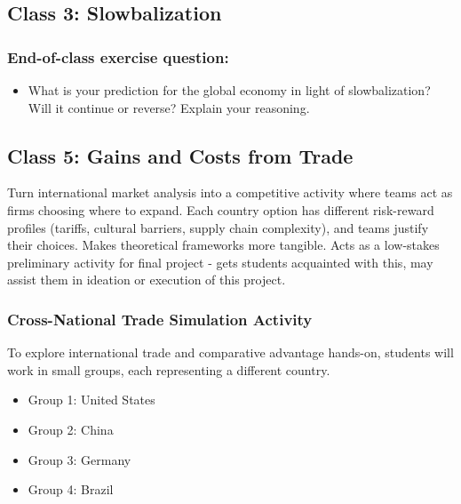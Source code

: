 \documentclass[
  11pt,
]{article}
\providecommand{\tightlist}{%
  \setlength{\itemsep}{0pt}\setlength{\parskip}{0pt}}
\begin{document}
\subsection{Class 3: Slowbalization}\label{class-3-slowbalization}

\subsubsection{End-of-class exercise
question:}\label{end-of-class-exercise-question-1}

\begin{itemize}
\tightlist
\item
  What is your prediction for the global economy in light of
  slowbalization? Will it continue or reverse? Explain your reasoning.
\end{itemize}

\subsection{Class 5: Gains and Costs from
Trade}\label{class-5-gains-and-costs-from-trade}

Turn international market analysis into a competitive activity where
teams act as firms choosing where to expand. Each country option has
different risk-reward profiles (tariffs, cultural barriers, supply chain
complexity), and teams justify their choices. Makes theoretical
frameworks more tangible. Acts as a low-stakes preliminary activity for
final project - gets students acquainted with this, may assist them in
ideation or execution of this project.

\subsubsection{Cross-National Trade Simulation
Activity}\label{cross-national-trade-simulation-activity}

To explore international trade and comparative advantage hands-on,
students will work in small groups, each representing a different
country.

\begin{itemize}
\tightlist
\item
  Group 1: United States\\
\item
  Group 2: China\\
\item
  Group 3: Germany\\
\item
  Group 4: Brazil
\end{itemize}
\end{document}
